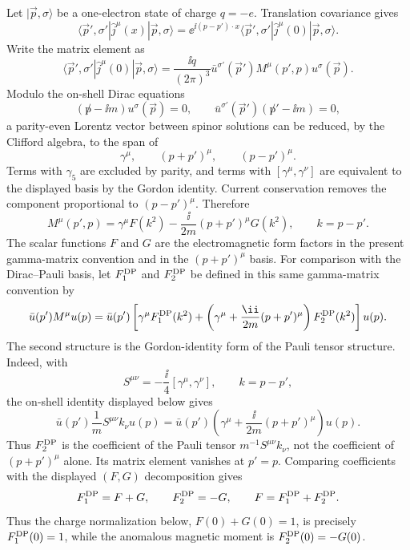 \begin{definition}
\label{def:qed-electron-electromagnetic-form-factors}
Let \(|\vec p,\sigma\rangle\) be a one-electron state of charge \(q=-e\).
Translation covariance gives
\[
  \langle\vec p',\sigma'|\widehat j^\mu(x)|\vec p,\sigma\rangle
  =
  \ee^{\ii(p-p')\cdot x}
  \langle\vec p',\sigma'|\widehat j^\mu(0)|\vec p,\sigma\rangle .
\]
Write the matrix element as
\[
  \langle\vec p',\sigma'|\widehat j^\mu(0)|\vec p,\sigma\rangle
  =
  \frac{\ii q}{(2\pi)^3}
  \bar u^{\sigma'}(\vec p')M^\mu(p',p)u^\sigma(\vec p).
\]
Modulo the on-shell Dirac equations
\[
  (\not p-\ii m)u^\sigma(\vec p)=0,\qquad
  \bar u^{\sigma'}(\vec p')(\not p'-\ii m)=0,
\]
a parity-even Lorentz vector between spinor solutions can be reduced, by the
Clifford algebra, to the span of
\[
  \gamma^\mu,\qquad (p+p')^\mu,\qquad (p-p')^\mu .
\]
Terms with \(\gamma_5\) are excluded by parity, and terms with
\([\gamma^\mu,\gamma^\nu]\) are equivalent to the displayed basis by the
Gordon identity.  Current conservation removes the component proportional to
\((p-p')^\mu\). Therefore
\[
  M^\mu(p',p)
  =
  \gamma^\mu F(k^2)
  -\frac{\ii}{2m}(p+p')^\mu G(k^2),
  \qquad
  k=p-p' .
\]
The scalar functions \(F\) and \(G\) are the electromagnetic form factors in
the present gamma-matrix convention and in the \((p+p')^\mu\) basis.  For
comparison with the Dirac--Pauli basis, let
\(F_1^{\rm DP}\) and \(F_2^{\rm DP}\) be defined in this same gamma-matrix
convention by
\[
  \bar u(p')M^\mu u(p)
  =
  \bar u(p')
  \left[
    \gamma^\mu F_1^{\rm DP}(k^2)
    +
    \left(\gamma^\mu+\frac{\ii}{2m}(p+p')^\mu\right)
    F_2^{\rm DP}(k^2)
  \right]
  u(p).
\]
The second structure is the Gordon-identity form of the Pauli tensor
structure.  Indeed, with
\[
  S^{\mu\nu}=-\frac{\ii}{4}[\gamma^\mu,\gamma^\nu],
  \qquad k=p-p',
\]
the on-shell identity displayed below gives
\begin{equation}
  \bar u(p')\frac1m S^{\mu\nu}k_\nu u(p)
  =
  \bar u(p')
  \left(\gamma^\mu+\frac{\ii}{2m}(p+p')^\mu\right)
  u(p).
  \label{eq:qed-pauli-gordon-current-convention}
\end{equation}
Thus \(F_2^{\rm DP}\) is the coefficient of the Pauli tensor
\(m^{-1}S^{\mu\nu}k_\nu\), not the coefficient of \((p+p')^\mu\) alone.
Its matrix element vanishes at \(p'=p\).  Comparing coefficients with the
displayed \((F,G)\) decomposition gives
\[
  F_1^{\rm DP}=F+G,
  \qquad
  F_2^{\rm DP}=-G,
  \qquad
  F=F_1^{\rm DP}+F_2^{\rm DP}.
\]
Thus the charge normalization below, \(F(0)+G(0)=1\), is precisely
\(F_1^{\rm DP}(0)=1\), while the anomalous magnetic moment is
\(F_2^{\rm DP}(0)=-G(0)\).
\end{definition}


